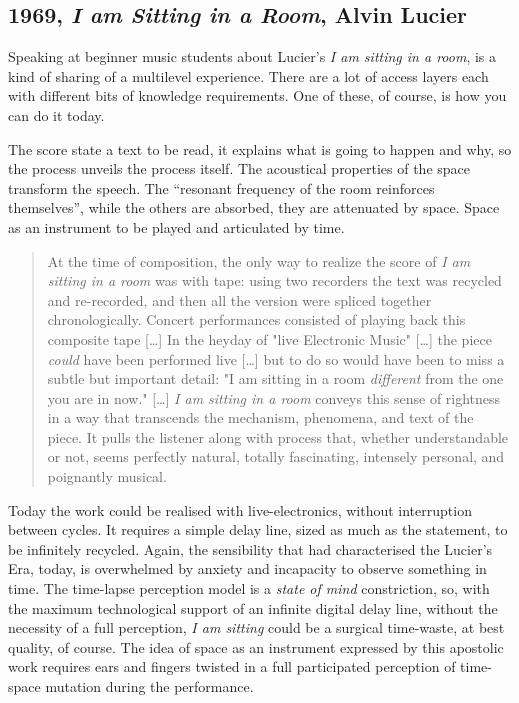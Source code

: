\documentclass[twoside,a4paper]{article}
\begin{document}

\subsection{1969, \emph{I am Sitting in a Room}, Alvin Lucier}

Speaking at beginner music students about Lucier's \emph{I am sitting in a room}, is a kind of sharing of a multilevel experience. There are a lot of access layers each with different bits of knowledge requirements. One of these, of course, is how you can do it today.

The score state a text to be read, it explains what is going to happen and why, so the process unveils the process itself. The acoustical properties of the space transform the speech. The “resonant frequency of the room reinforces themselves”, while the others are absorbed, they are attenuated by space. Space as an instrument to be played and articulated by time.

\begin{quote}
At the time of composition, the only way to realize the score of \emph{I am sitting in a room} was with tape: using two recorders the text was recycled and re-recorded, and then all the version were spliced together chronologically. Concert performances consisted of playing back this composite tape [\ldots] In the heyday of "live Electronic Music" [\ldots] the piece \emph{could} have been performed live [\ldots] but to do so would have been to miss a subtle but important detail: "I am sitting in a room \emph{different} from the one you are in now." [\ldots] \emph{I am sitting in a room} conveys this sense of rightness in a way that transcends the mechanism, phenomena, and text of the piece. It pulls the listener along with process that, whether understandable or not, seems perfectly natural, totally fascinating, intensely personal, and poignantly musical. \cite{alCD90}
\end{quote}

Today the work could be realised with live-electronics, without interruption between cycles. It requires a simple delay line, sized as much as the statement, to be infinitely recycled. Again, the sensibility that had characterised the Lucier's Era, today, is overwhelmed by anxiety and incapacity to observe something in time. The time-lapse perception model is a \emph{state of mind} constriction, so, with the maximum technological support of an infinite digital delay line, without the necessity of a full perception, \emph{I am sitting} could be a surgical time-waste, at best quality, of course. The idea of space as an instrument expressed by this apostolic work requires ears and fingers twisted in a full participated perception of time-space mutation during the performance.
\end{document}
